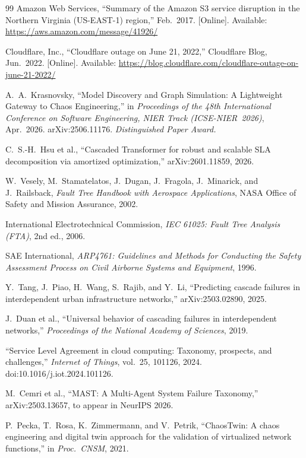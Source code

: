 \documentclass[10pt,twocolumn]{article}
\begin{document}
\begin{thebibliography}{99}
Amazon Web Services,
``Summary of the Amazon S3 service disruption in the Northern
Virginia (US-EAST-1) region,''
Feb.~2017. [Online]. Available:
\url{https://aws.amazon.com/message/41926/}

Cloudflare, Inc.,
``Cloudflare outage on June 21, 2022,''
Cloudflare Blog, Jun.~2022. [Online]. Available:
\url{https://blog.cloudflare.com/cloudflare-outage-on-june-21-2022/}

A.~A.~Krasnovsky,
``Model Discovery and Graph Simulation: A Lightweight Gateway to
Chaos Engineering,''
in \textit{Proceedings of the 48th International Conference on
Software Engineering, NIER Track (ICSE-NIER~2026)}, Apr.~2026.
arXiv:2506.11176.
\newblock \textit{Distinguished Paper Award.}

C.~S.-H.~Hsu et al.,
``Cascaded Transformer for robust and scalable SLA decomposition
via amortized optimization,'' arXiv:2601.11859, 2026.

W.~Vesely, M.~Stamatelatos, J.~Dugan, J.~Fragola, J.~Minarick, and
J.~Railsback,
\textit{Fault Tree Handbook with Aerospace Applications},
NASA Office of Safety and Mission Assurance, 2002.

International Electrotechnical Commission,
\textit{IEC 61025: Fault Tree Analysis (FTA)},
2nd ed., 2006.

SAE International,
\textit{ARP4761: Guidelines and Methods for Conducting the Safety
Assessment Process on Civil Airborne Systems and Equipment},
1996.

Y.~Tang, J.~Piao, H.~Wang, S.~Rajib, and Y.~Li,
``Predicting cascade failures in interdependent urban
infrastructure networks,'' arXiv:2503.02890, 2025.

J.~Duan et al.,
``Universal behavior of cascading failures in interdependent
networks,''
\textit{Proceedings of the National Academy of Sciences}, 2019.

``Service Level Agreement in cloud computing: Taxonomy, prospects,
and challenges,'' \textit{Internet of Things}, vol.~25, 101126,
2024. doi:10.1016/j.iot.2024.101126.

M.~Cemri et al.,
``MAST: A Multi-Agent System Failure Taxonomy,''
arXiv:2503.13657, to appear in NeurIPS 2026.

P.~Pecka, T.~Rosa, K.~Zimmermann, and V.~Petrik,
``ChaosTwin: A chaos engineering and digital twin approach for
the validation of virtualized network functions,''
in \textit{Proc.\ CNSM}, 2021.


\end{thebibliography}
\end{document}

